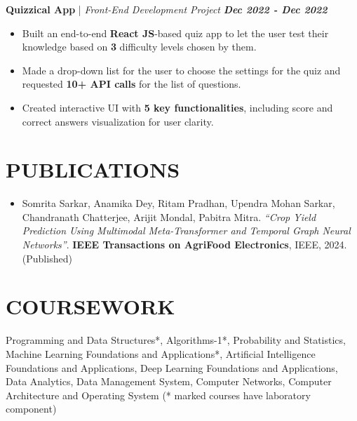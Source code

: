 \documentclass[a4paper,9pt]{extarticle}
\begin{document}
\vspace{-0.05cm}
\noindent
\textbf{Quizzical App} | \textit{Front-End Development Project} \hfill \textbf{\textit{Dec 2022 - Dec 2022}} %
\vspace{-0.15cm}
\begin{itemize}
    \item Built an end-to-end \textbf{React JS}-based quiz app to let the user test their knowledge based on \textbf{3} difficulty levels chosen by them.
    \item Made a drop-down list for the user to choose the settings for the quiz and requested \textbf{10+ API calls} for the list of questions.
    \item Created interactive UI with \textbf{5 key functionalities}, including score and correct answers visualization for user clarity.
\end{itemize}

\vspace{-0.4cm}
\section*{PUBLICATIONS}
\vspace{-0.3cm}
\noindent
\begin{itemize}
  \item Somrita Sarkar, Anamika Dey, Ritam Pradhan, Upendra Mohan Sarkar, Chandranath Chatterjee, Arijit Mondal, Pabitra Mitra.  
  \emph{“Crop Yield Prediction Using Multimodal Meta-Transformer and Temporal Graph Neural Networks”}.  
  \textbf{IEEE Transactions on AgriFood Electronics}, IEEE, 2024. (Published)
\end{itemize}

\vspace{-0.4cm}
\section*{COURSEWORK}
    \vspace{-0.2cm}
    Programming and Data Structures*, Algorithms-1*, Probability and Statistics, Machine Learning Foundations and Applications*, Artificial Intelligence Foundations and Applications, Deep Learning Foundations and Applications, Data Analytics, Data Management System, Computer Networks, Computer Architecture and Operating System (* marked courses have laboratory component)
\end{document}

